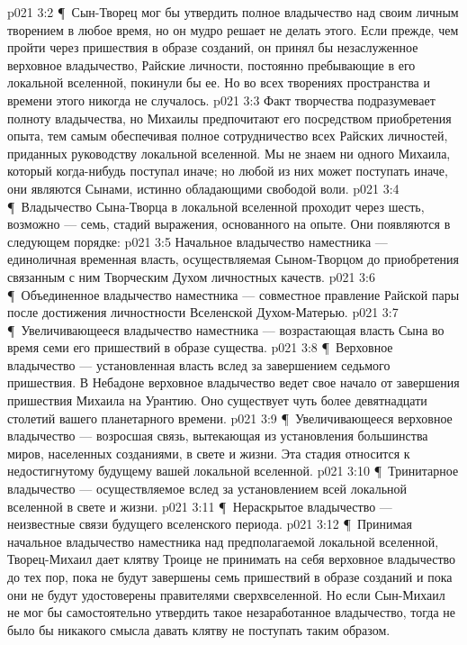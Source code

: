 \vs p021 3:2 \P\ Сын\hyp{}Творец мог бы утвердить полное владычество над своим личным творением в любое время, но он мудро решает не делать этого. Если прежде, чем пройти через пришествия в образе созданий, он принял бы незаслуженное верховное владычество, Райские личности, постоянно пребывающие в его локальной вселенной, покинули бы ее. Но во всех творениях пространства и времени этого никогда не случалось.
\vs p021 3:3 Факт творчества подразумевает полноту владычества, но Михаилы предпочитают  его посредством приобретения опыта, тем самым обеспечивая полное сотрудничество всех Райских личностей, приданных руководству локальной вселенной. Мы не знаем ни одного Михаила, который когда\hyp{}нибудь поступал иначе; но любой из них может поступать иначе, они являются Сынами, истинно обладающими свободой воли.
\vs p021 3:4 \P\ Владычество Сына\hyp{}Творца в локальной вселенной проходит через шесть, возможно --- семь, стадий выражения, основанного на опыте. Они появляются в следующем порядке:
\vs p021 3:5 \bibnobreakspace Начальное владычество наместника --- единоличная временная власть, осуществляемая Сыном\hyp{}Творцом до приобретения связанным с ним Творческим Духом личностных качеств.
\vs p021 3:6 \P\ \bibnobreakspace Объединенное владычество наместника --- совместное правление Райской пары после достижения личностности Вселенской Духом\hyp{}Матерью.
\vs p021 3:7 \P\ \bibnobreakspace Увеличивающееся владычество наместника --- возрастающая власть Сына во время семи его пришествий в образе существа.
\vs p021 3:8 \P\ \bibnobreakspace Верховное владычество --- установленная власть вслед за завершением седьмого пришествия. В Небадоне верховное владычество ведет свое начало от завершения пришествия Михаила на Урантию. Оно существует чуть более девятнадцати столетий вашего планетарного времени.
\vs p021 3:9 \P\ \bibnobreakspace Увеличивающееся верховное владычество --- возросшая связь, вытекающая из установления большинства миров, населенных созданиями, в свете и жизни. Эта стадия относится к недостигнутому будущему вашей локальной вселенной.
\vs p021 3:10 \P\ \bibnobreakspace Тринитарное владычество --- осуществляемое вслед за установлением всей локальной вселенной в свете и жизни.
\vs p021 3:11 \P\ \bibnobreakspace Нераскрытое владычество --- неизвестные связи будущего вселенского периода.
\vs p021 3:12 \P\ Принимая начальное владычество наместника над предполагаемой локальной вселенной, Творец\hyp{}Михаил дает клятву Троице не принимать на себя верховное владычество до тех пор, пока не будут завершены семь пришествий в образе созданий и пока они не будут удостоверены правителями сверхвселенной. Но если Сын\hyp{}Михаил не мог бы самостоятельно утвердить такое незаработанное владычество, тогда не было бы никакого смысла давать клятву не поступать таким образом.
